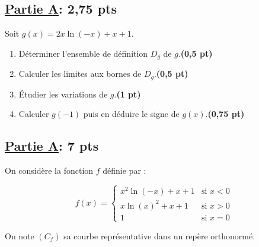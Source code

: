 \documentclass[12pt,a4paper]{article}
\begin{document}
\subsection*{\underline{\textbf{Partie A}}:\textbf{ 2,75 pts}}

Soit \( g(x) = 2x \ln(-x) + x + 1 \).

\begin{enumerate}
    \item Déterminer l’ensemble de définition \( D_g \) de \( g \).\hfill \textbf{(0,5 pt)}
    \item Calculer les limites aux bornes de \( D_g \).\hfill \textbf{(0,5 pt)}
    \item Étudier les variations de \( g \).\hfill \textbf{(1 pt)}
    \item Calculer \( g(-1) \) puis en déduire le signe de \( g(x) \).\hfill \textbf{(0,75 pt)}
\end{enumerate}

\subsection*{\underline{\textbf{Partie A}}:\textbf{ 7 pts}}

On considère la fonction \( f \) définie par :

\[
    f(x) =
    \begin{cases}
        x^2 \ln(-x) + x + 1 & \text{si } x < 0 \\
        x \ln(x)^2 + x + 1  & \text{si } x > 0 \\
        1                   & \text{si } x = 0
    \end{cases}
\]

On note \( (C_f) \) sa courbe représentative dans un repère orthonormé.
\end{document}
